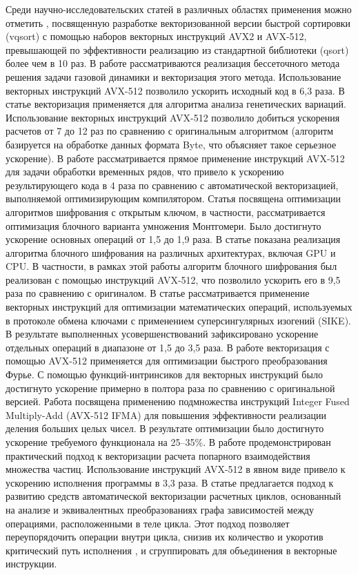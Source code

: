 Среди научно-исследовательских статей в различных областях применения можно отметить \cite{Blacher2022VecQuick}, посвященную разработке векторизованной версии быстрой сортировки (vqsort) с помощью наборов векторных инструкций AVX2 и AVX-512, превышающей по эффективности реализацию из стандартной библиотеки (qsort) более чем в 10 раз.
В работе \cite{Long2022VecSPD} рассматриваются реализация бессеточного метода решения задачи газовой динамики и векторизация этого метода. 
Использование векторных инструкций AVX-512 позволило ускорить исходный код в 6,3 раза.
В статье \cite{PonteFernandez2022VecInteractions} векторизация применяется для алгоритма анализа генетических вариаций.
Использование векторных инструкций AVX-512 позволило добиться ускорения расчетов от 7 до 12 раз по сравнению с оригинальным алгоритмом (алгоритм базируется на обработке данных формата Byte, что объясняет такое серьезное ускорение).
В работе \cite{Quisland2023VecSeries} рассматривается прямое применение инструкций AVX-512 для задачи обработки временных рядов, что привело к ускорению результирующего кода в 4 раза по сравнению с автоматической векторизацией, выполняемой оптимизирующим компилятором. 
Статья \cite{Buhrow2022VecMult} посвящена оптимизации алгоритмов шифрования с открытым ключом, в частности, рассматривается оптимизация блочного варианта умножения Монтгомери.
Было достигнуто ускорение основных операций от 1,5 до 1,9 раза.
В статье \cite{Choi2022VecPIPO} показана реализация алгоритма блочного шифрования на различных архитектурах, включая GPU\label{abbr:gpu-1} и CPU\label{abbr:cpu-1}.
В частности, в рамках этой работы алгоритм блочного шифрования был реализован с помощью инструкций AVX-512, что позволило ускорить его в 9,5 раза по сравнению с оригиналом.
В статье \cite{Cheng2022VecSIKE} рассматривается применение векторных инструкций для оптимизации математических операций, используемых в протоколе обмена ключами с применением суперсингулярных изогений (SIKE)\label{abbr:sike-1}.
В результате выполненных усовершенствований зафиксировано ускорение отдельных операций в диапазоне от 1,5 до 3,5 раза.
В работе \cite{Sansone2023VecFourier} векторизация с помощью AVX-512 применяется для оптимизации быстрого преобразования Фурье.
С помощью функций-интринсиков для векторных инструкций было достигнуто ускорение примерно в полтора раза по сравнению с оригинальной версией.
Работа \cite{Edamatsu2023VecDiv} посвящена применению подмножества инструкций Integer Fused Multiply-Add (AVX-512 IFMA)\label{abbr:ifma-1} для повышения эффективности реализации деления больших целых чисел.
В результате оптимизации было достигнуто ускорение требуемого функционала на 25–35\%.
В работе \cite{Medakin2021VecPP} продемонстрирован практический подход к векторизации расчета попарного взаимодействия множества частиц.
Использование инструкций AVX-512 в явном виде привело к ускорению исполнения программы в 3,3 раза.
В статье \cite{Tayeb2023VecAuto} предлагается подход к развитию средств автоматической векторизации расчетных циклов, основанный на анализе и эквивалентных преобразованиях графа зависимостей между операциями, расположенными в теле цикла.
Этот подход позволяет переупорядочить операции внутри цикла, снизив их количество и укоротив критический путь исполнения \cite{Laukemann2019VecAuto}, и сгруппировать для объединения в векторные инструкции.

